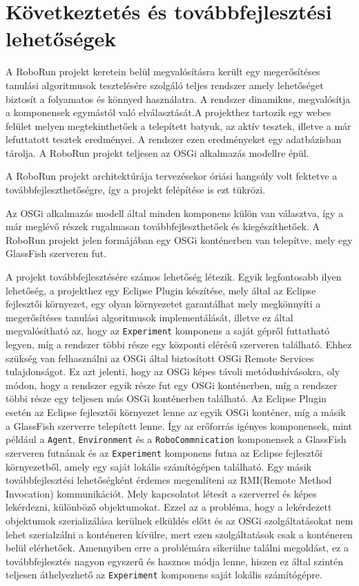 \chapter{Következtetés és továbbfejlesztési lehetőségek}\label{ch:KOVETKEZTETESEK}

A RoboRun projekt keretein belül megvalósításra került egy megerősítéses tanulási algoritmusok tesztelésére szolgáló teljes rendszer amely lehetőséget biztosít a folyamatos és könnyed használatra. A rendszer dinamikus, megvalósítja a komponensek egymástól való elválasztását.A projekthez tartozik egy webes felület melyen megtekinthetőek a telepített batyuk, az aktív tesztek, illetve a már lefuttatott tesztek eredményei. A rendszer ezen eredményeket egy adatbázisban tárolja. A RoboRun projekt teljesen az OSGi alkalmazás modellre épül.

A RoboRun projekt architektúrája tervezésekor óriási hangsúly volt fektetve a továbbfejleszthetőségre, így a projekt felépítése is ezt tükrözi.

Az OSGi alkalmazás modell által minden komponens külön van választva, így a már meglévő részek rugalmasan továbbfejleszthetőek és kiegészíthetőek. A RoboRun projekt jelen formájában egy OSGi konténerben van telepítve, mely egy GlassFish szerveren fut.

A projekt továbbfejlesztésére számos lehetőség létezik. Egyik legfontosabb ilyen lehetőség, a projekthez egy Eclipse Plugin\cite{eclipseplugin} készítése, mely által az Eclipse fejlesztői környezet, egy olyan környezetet garantálhat mely megkönnyíti a megerősítéses tanulási algoritmusok implementálását, illetve ez által megvalósítható az, hogy az \texttt{Experiment} komponens a saját gépről futtatható legyen, míg a rendszer többi része egy központi elérésű szerveren található. Ehhez szükség van felhasználni az OSGi által biztosított OSGi Remote Services tulajdonságot. Ez azt jelenti, hogy az OSGi képes távoli metódushívásokra, oly módon, hogy a rendszer egyik része fut egy OSGi konténerben, míg a rendszer többi része  egy teljesen más OSGi konténerben található. Az Eclipse Plugin esetén az Eclipse fejlesztői környezet lenne az egyik OSGi konténer, míg a másik a GlassFish szerverre telepített lenne. Így az erőforrás igényes komponensek, mint például a \texttt{Agent}, \texttt{Environment} és a \texttt{RoboCommnication} komponensek a GlassFish szerveren futnának és az \texttt{Experiment} komponens futna az Eclipse fejlesztői környezetből, amely egy saját lokális számítógépen található. 
Egy másik továbbfejlesztési lehetőségként érdemes megemlíteni az RMI(Remote Method Invocation) kommunikációt. Mely kapcsolatot létesít a szerverrel és képes lekérdezni, különböző objektumokat. Ezzel az a probléma, hogy a lekérdezett objektumok szerializálása kerülnek elküldés előtt és az OSGi szolgáltatásokat nem lehet szerialzálni a konténeren kívülre, mert ezen szolgáltatások csak a konténeren belül elérhetőek. Amennyiben erre a problémára sikerülne találni megoldást, ez a továbbfejlesztés nagyon egyszerű és hasznos módja lenne, hiszen ez által szintén teljesen áthelyezhető az \texttt{Experiment} komponens saját lokális számítógépre.

